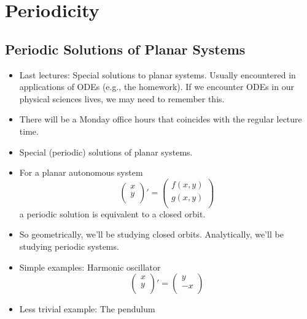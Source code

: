 \documentclass[../notes.tex]{subfiles}
\begin{document}
\chapter{Periodicity}
\section{Periodic Solutions of Planar Systems}
\begin{itemize}
    \item {}Last lectures: Special solutions to planar systems. Usually encountered in applications of ODEs (e.g., the homework). If we encounter ODEs in our physical sciences lives, we may need to remember this.
    \item There will be a Monday office hours that coincides with the regular lecture time.
    \item Special (periodic) solutions of planar systems.
    \item For a planar autonomous system
    \begin{equation*}
        \begin{pmatrix}
            x\\
            y\\
        \end{pmatrix}'
        =
        \begin{pmatrix}
            f(x,y)\\
            g(x,y)\\
        \end{pmatrix}
    \end{equation*}
    a periodic solution is equivalent to a closed orbit.
    \item So geometrically, we'll be studying closed orbits. Analytically, we'll be studying periodic systems.
    \item Simple examples: Harmonic oscillator
    \begin{equation*}
        \begin{pmatrix}
            x\\
            y\\
        \end{pmatrix}'
        =
        \begin{pmatrix}
            y\\
            -x\\
        \end{pmatrix}
    \end{equation*}
    \item Less trivial example: The pendulum

\end{itemize}
\end{document}
